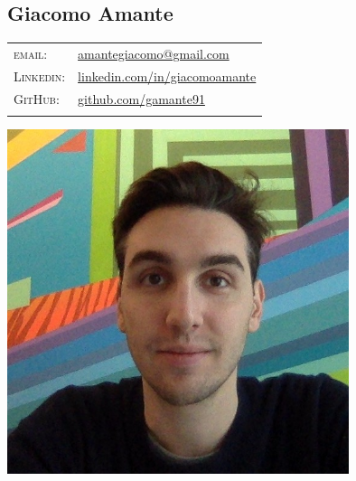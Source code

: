\documentclass[a4paper,10pt]{article}
\begin{document}
   \pagestyle{empty}

   \begin{minipage}{0.75\textwidth}
      \vspace{-10mm}
      \begin{flushleft}
         \section{\Huge Giacomo Amante}
         \vspace{2mm}
         \begin{tabular}{ll}
            \textsc{email:} & \href{mailto:amantegiacomo@gmail.com}{amantegiacomo@gmail.com} \\
            \textsc{Linkedin:} & 
            \href{http://www.linkedin.com/in/giacomoamante}{\color{black}linkedin.com/in/giacomoamante}\\
            \textsc{GitHub:} & \href{https://github.com/gamante91}{github.com/gamante91}\\
            \multicolumn{2}{c}{} \\
         \end{tabular}
      \end{flushleft}
   \end{minipage}
   \begin{minipage}[c]{0.25\textwidth}
      \begin{center}
         \includegraphics[width=0.75\textwidth]{GiacomoAmante_lowres}
      \end{center}
   \end{minipage}
\end{document}
